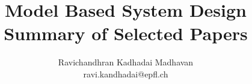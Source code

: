 \documentclass[10pt,journal,a4paper]{IEEEtran}
\begin{document}
\title{Model Based System Design \\ Summary of Selected Papers}

\author{Ravichandhran Kadhadai Madhavan
\\ ravi.kandhadai@epfl.ch }

\maketitle



%



\end{document}
